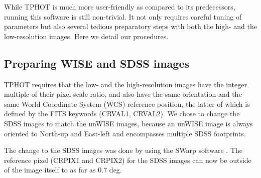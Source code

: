 \documentclass[numberedappendix,apj,twocolumn]{emulateapj}
\begin{document}
While TPHOT is much more user-friendly as compared to its predecessors, running this software is still non-trivial. It not only requires careful tuning of parameters but also several tedious preparatory steps with both the high- and the low-resolution images. Here we detail our procedures.
	

\subsection{Preparing WISE and SDSS images} 



TPHOT requires that the low- and the high-resolution images have the integer multiple of their pixel scale ratio, and also have the same orientation and the same World Coordinate System (WCS) reference position, the latter of which is defined by the FITS keywords (CRVAL1, CRVAL2). We chose to change the SDSS images to match the unWISE images, because an unWISE image is always oriented to North-up and East-left and encompasses multiple SDSS footprints. 

The change to the SDSS images was done by using the SWarp software \citep[][]{Bertin2002}. The reference pixel (CRPIX1 and CRPIX2) for the SDSS images can now be outside of the image itself to as far as 0.7 deg.
\end{document}
